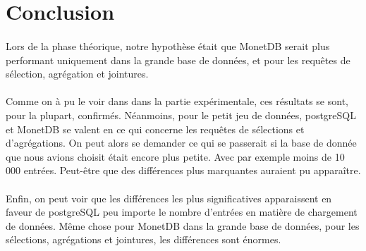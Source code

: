 \documentclass[11pt]{extarticle}
\begin{document}
\section{Conclusion}
\paragraph{}
Lors de la phase théorique, notre hypothèse était que MonetDB serait plus performant uniquement dans la grande base de données, et pour les requêtes de sélection, agrégation et jointures.
\paragraph{}
Comme on à pu le voir dans dans la partie expérimentale, ces résultats se sont, pour la plupart, confirmés. Néanmoins, pour le petit jeu de données, postgreSQL et MonetDB se valent en ce qui concerne les requêtes de sélections et d'agrégations. On peut alors se demander ce qui se passerait si la base de donnée que nous avions choisit était encore plus petite. Avec par exemple moins de 10 000 entrées. Peut-être que des différences plus marquantes auraient pu apparaître.
\paragraph{}
Enfin, on peut voir que les différences les plus significatives apparaissent en faveur de postgreSQL peu importe le nombre d'entrées en matière de chargement de données. Même chose pour MonetDB dans la grande base de données, pour les sélections, agrégations et jointures, les différences sont énormes.
\end{document}
